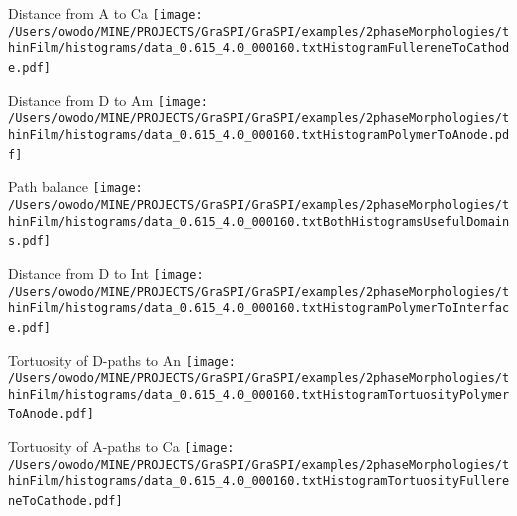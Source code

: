\documentclass{article}
\begin{document}
\parbox{0.60\textwidth}{
\parbox{0.3\textwidth}{\centering Distance from A to Ca \newline
\texttt{[image: /Users/owodo/MINE/PROJECTS/GraSPI/GraSPI/examples/2phaseMorphologies/thinFilm/histograms/data\_0.615\_4.0\_000160.txtHistogramFullereneToCathode.pdf]} \ ~ \ } 
\parbox{0.3\textwidth}{\centering Distance from D to Am \newline
\texttt{[image: /Users/owodo/MINE/PROJECTS/GraSPI/GraSPI/examples/2phaseMorphologies/thinFilm/histograms/data\_0.615\_4.0\_000160.txtHistogramPolymerToAnode.pdf]} \ ~ \ }
\parbox{0.3\textwidth}{\centering Path balance \newline 
\texttt{[image: /Users/owodo/MINE/PROJECTS/GraSPI/GraSPI/examples/2phaseMorphologies/thinFilm/histograms/data\_0.615\_4.0\_000160.txtBothHistogramsUsefulDomains.pdf]} \ ~ \ }
\parbox{0.3\textwidth}{\centering Distance from D to Int \newline 
\texttt{[image: /Users/owodo/MINE/PROJECTS/GraSPI/GraSPI/examples/2phaseMorphologies/thinFilm/histograms/data\_0.615\_4.0\_000160.txtHistogramPolymerToInterface.pdf]} \ ~ \ }
\parbox{0.3\textwidth}{\centering Tortuosity of D-paths to An  \newline
\texttt{[image: /Users/owodo/MINE/PROJECTS/GraSPI/GraSPI/examples/2phaseMorphologies/thinFilm/histograms/data\_0.615\_4.0\_000160.txtHistogramTortuosityPolymerToAnode.pdf]} \ ~ \ }
\parbox{0.3\textwidth}{\centering Tortuosity of A-paths to Ca \newline
\texttt{[image: /Users/owodo/MINE/PROJECTS/GraSPI/GraSPI/examples/2phaseMorphologies/thinFilm/histograms/data\_0.615\_4.0\_000160.txtHistogramTortuosityFullereneToCathode.pdf]} \ ~ \ }
}
\newpage
\end{document}
